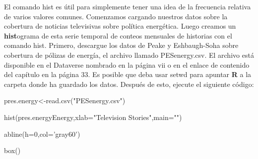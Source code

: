 \documentclass[
]{book}
\newenvironment{Shaded}{\begin{snugshade}}{\end{snugshade}}
\newcommand{\AttributeTok}[1]{\textcolor[rgb]{0.77,0.63,0.00}{#1}}
\newcommand{\DecValTok}[1]{\textcolor[rgb]{0.00,0.00,0.81}{#1}}
\newcommand{\FunctionTok}[1]{\textcolor[rgb]{0.00,0.00,0.00}{#1}}
\newcommand{\NormalTok}[1]{#1}
\newcommand{\OtherTok}[1]{\textcolor[rgb]{0.56,0.35,0.01}{#1}}
\newcommand{\StringTok}[1]{\textcolor[rgb]{0.31,0.60,0.02}{#1}}
\begin{document}
El comando hist es útil para simplemente tener una idea de la frecuencia relativa de varios valores comunes. Comenzamos cargando nuestros datos sobre la cobertura de noticias televisivas sobre política energética. Luego creamos un \textbf{hist}ograma de esta serie temporal de conteos mensuales de historias con el comando hist. Primero, descargue los datos de Peake y Eshbaugh-Soha sobre cobertura de pólizas de energía, el archivo llamado PESenergy.csv. El archivo está disponible en el Dataverse nombrado en la página vii o en el enlace de contenido del capítulo en la página 33. Es posible que deba usar setwd para apuntar \textbf{R} a la carpeta donde ha guardado los datos. Después de esto, ejecute el siguiente código:

\begin{Shaded}
\begin{Highlighting}[]
\NormalTok{pres.energy}\OtherTok{\textless{}{-}}\FunctionTok{read.csv}\NormalTok{(}\StringTok{"PESenergy.csv"}\NormalTok{)}

\FunctionTok{hist}\NormalTok{(pres.energyEnergy,}\AttributeTok{xlab=}\StringTok{"Television Stories"}\NormalTok{,}\AttributeTok{main=}\StringTok{""}\NormalTok{)}

\FunctionTok{abline}\NormalTok{(}\AttributeTok{h=}\DecValTok{0}\NormalTok{,}\AttributeTok{col=}\NormalTok{’gray60’)}

\FunctionTok{box}\NormalTok{()}
\end{Highlighting}
\end{Shaded}
\end{document}
